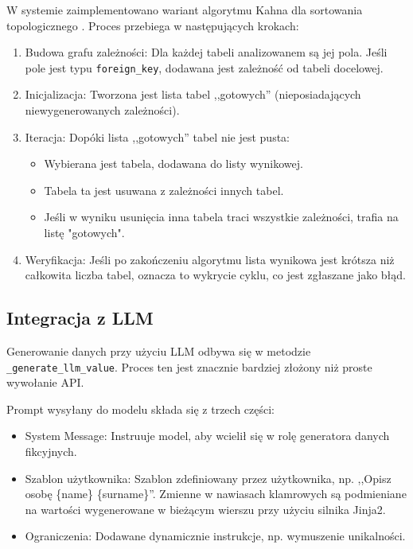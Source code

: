 W systemie zaimplementowano wariant algorytmu Kahna dla sortowania topologicznego \cite{topological_sort}. Proces przebiega w następujących krokach:
\begin{enumerate}
    \item Budowa grafu zależności: Dla każdej tabeli analizowanem są jej pola. Jeśli pole jest typu \texttt{foreign\_key}, dodawana jest zależność od tabeli docelowej.
    \item Inicjalizacja: Tworzona jest lista tabel ,,gotowych'' (nieposiadających niewygenerowanych zależności).
    \item Iteracja: Dopóki lista ,,gotowych'' tabel nie jest pusta:
          \begin{itemize}
              \item Wybierana jest tabela, dodawana do listy wynikowej.
              \item Tabela ta jest usuwana z zależności innych tabel.
              \item Jeśli w wyniku usunięcia inna tabela traci wszystkie zależności, trafia na listę "gotowych".
          \end{itemize}
    \item Weryfikacja: Jeśli po zakończeniu algorytmu lista wynikowa jest krótsza niż całkowita liczba tabel, oznacza to wykrycie cyklu, co jest zgłaszane jako błąd.
\end{enumerate}

\subsection*{Integracja z LLM}
Generowanie danych przy użyciu \gls{LLM} odbywa się w metodzie \texttt{\_generate\_llm\_value}. Proces ten jest znacznie bardziej złożony niż proste wywołanie \gls{API}.

Prompt wysyłany do modelu składa się z trzech części:
\begin{itemize}
    \item System Message: Instruuje model, aby wcielił się w rolę generatora danych fikcyjnych.
    \item Szablon użytkownika: Szablon zdefiniowany przez użytkownika, np. ,,Opisz osobę \{name\} \{surname\}''. Zmienne w nawiasach klamrowych są podmieniane na wartości wygenerowane w bieżącym wierszu przy użyciu silnika Jinja2.
    \item Ograniczenia: Dodawane dynamicznie instrukcje, np. wymuszenie unikalności.
\end{itemize}

